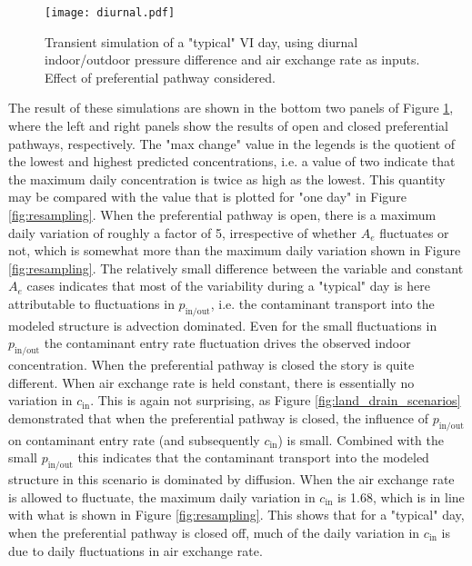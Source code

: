 \documentclass[preprint,12pt]{elsarticle}
\begin{document}
\begin{figure}
  \centering
 \texttt{[image: diurnal.pdf]}
 \caption{Transient simulation of a "typical" VI day, using diurnal indoor/outdoor pressure difference and air exchange rate as inputs. Effect of preferential pathway considered.}\label{fig:diurnal}
\end{figure}

The result of these simulations are shown in the bottom two panels of Figure \ref{fig:diurnal}, where the left and right panels show the results of open and closed preferential pathways, respectively.
The "max change" value in the legends is the quotient of the lowest and highest predicted concentrations, i.e. a value of two indicate that the maximum daily concentration is twice as high as the lowest.
This quantity may be compared with the value that is plotted for "one day" in Figure \ref{fig:resampling}.
When the preferential pathway is open, there is a maximum daily variation of roughly a factor of 5, irrespective of whether $A_e$ fluctuates or not, which is somewhat more than the maximum daily variation shown in Figure \ref{fig:resampling}.
The relatively small difference between the variable and constant $A_e$ cases indicates that most of the variability during a "typical" day is here attributable to fluctuations in $p_\mathrm{in/out}$, i.e. the contaminant transport into the modeled structure is advection dominated.
Even for the small fluctuations in $p_\mathrm{in/out}$ the contaminant entry rate fluctuation drives the observed indoor concentration.
When the preferential pathway is closed the story is quite different.
When air exchange rate is held constant, there is essentially no variation in $c_\mathrm{in}$.
This is again not surprising, as Figure \ref{fig:land_drain_scenarios} demonstrated that when the preferential pathway is closed, the influence of $p_\mathrm{in/out}$ on contaminant entry rate (and subsequently $c_\mathrm{in}$) is small.
Combined with the small $p_\mathrm{in/out}$ this indicates that the contaminant transport into the modeled structure in this scenario is dominated by diffusion.
When the air exchange rate is allowed to fluctuate, the maximum daily variation in $c_\mathrm{in}$ is 1.68, which is in line with what is shown in Figure \ref{fig:resampling}.
This shows that for a "typical" day, when the preferential pathway is closed off, much of the daily variation in $c_\mathrm{in}$ is due to daily fluctuations in air exchange rate.\par
\end{document}
